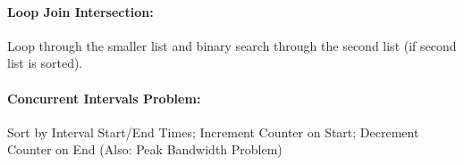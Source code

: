 \documentclass[12pt]{article}
\begin{document}
\paragraph{Loop Join Intersection:} Loop through the smaller list and binary search through the second list (if second list is sorted).

\paragraph{Concurrent Intervals Problem:} Sort by Interval Start/End Times; Increment Counter on Start; Decrement Counter on End (Also: Peak Bandwidth Problem)



\end{document}

